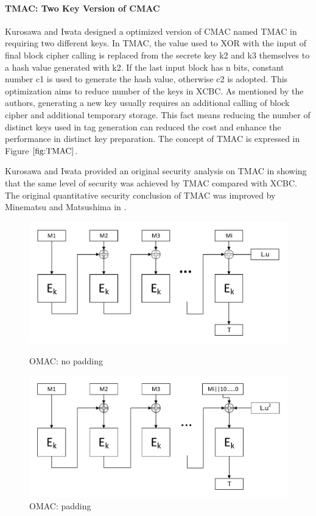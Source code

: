 \documentclass{article}
\begin{document}
\paragraph{TMAC: Two Key Version of CMAC}
Kurosawa and Iwata designed a optimized version of CMAC named TMAC in \cite{tmac} requiring two different keys.  
In TMAC,  the value used to XOR with the input of final block cipher calling is replaced from the secrete key k2 and k3 themselves to a hash value generated with k2. If the last input block has n bits, constant number c1 is used to generate the hash value, otherwise c2 is adopted. This optimization aims to reduce number of the keys in XCBC. As mentioned by the authors, generating a new key usually requires an additional calling of block cipher and additional temporary storage. This fact means reducing the number of distinct keys used in tag generation can reduced the cost and enhance the performance in distinct key preparation. The concept of TMAC is expressed in Figure $\ref{fig:TMAC}$.

Kurosawa and Iwata provided an original security analysis on TMAC in \cite{tmac} showing that the same level of security was achieved by TMAC compared with XCBC. The original quantitative security conclusion of TMAC was improved by Minematsu and Matsushima in \cite{new}. 
\begin{figure}[htbp]
\centering
\includegraphics[scale=0.5]{./diagrams/omac_nopadding.pdf}
\caption{OMAC: no padding}
\includegraphics[scale=0.5]{./diagrams/omac_padding.pdf}
\caption{OMAC: padding}
\label{fig:OMAC}
\end{figure}
\end{document}
